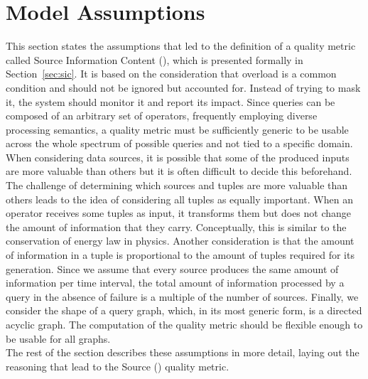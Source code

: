 \section{Model Assumptions}
\label{sec:assumptions}

This section states the assumptions that led to the definition of a quality metric called Source
Information Content (\sic), which is presented formally in Section~\ref{sec:sic}.
It is based on the consideration that overload is a common condition and should not be ignored but
accounted for. Instead of trying to mask it, the system should monitor it and report its impact.
Since queries can be composed of an arbitrary set of operators, frequently employing diverse processing
semantics, a quality metric must be sufficiently generic to be usable across the whole spectrum of
possible queries and not tied to a specific domain. \\
When considering data sources, it is possible that some of the produced inputs are more valuable than
others but it is often difficult to decide this beforehand. The challenge of determining which sources
and tuples are more valuable than others leads to the idea of considering all tuples as equally
important. When an operator receives some tuples as input, it transforms them but does not change the
amount of information that they carry.
Conceptually, this is similar to the conservation of energy law in physics.
Another consideration is that the amount of information in a tuple is proportional to the amount of
tuples required for its generation. Since we assume that every source produces the same amount of
information per time interval, the total amount of information processed by a query in the absence of
failure is a multiple of the number of sources. Finally, we consider the shape of a query graph, which,
in its most generic form, is a directed acyclic graph. The computation of the quality metric should be
flexible enough to be usable for all graphs. \\
The rest of the section describes these assumptions in more detail, laying out the reasoning that lead to
the Source \DIFdelbegin {}\DIFdelend \DIFaddbegin {}\DIFaddend (\sic) quality metric.\\

